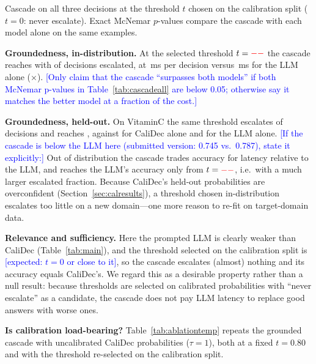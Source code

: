 \documentclass[twocolumn]{ICCKjournal}
\newcommand{\revnote}[1]{\textcolor{blue}{[#1]}}
\begin{document}
\begin{table}[t]
\caption{Cascade on all three decisions at the threshold $t$ chosen on the calibration split ($t=0$: never escalate). Exact McNemar $p$-values compare the cascade with each model alone on the same examples.}
\label{tab:cascadeall}
\centering
\begin{adjustbox}{max width=\linewidth}

\end{adjustbox}
\end{table}

\textbf{Groundedness, in-distribution.} At the selected threshold $t=\textcolor{red}{--}$ the cascade reaches \CascGrdTestAcc{} with \CascGrdTestEsc{} of decisions escalated, at \CascGrdMs{}\,ms per decision versus \CascGrdLLMMs{}\,ms for the LLM alone (\CascGrdSpeedup$\times$). \revnote{Only claim that the cascade ``surpasses both models'' if both McNemar p-values in Table~\ref{tab:cascadeall} are below 0.05; otherwise say it matches the better model at a fraction of the cost.}

\textbf{Groundedness, held-out.} On VitaminC the same threshold escalates \CascGrdHeldEsc{} of decisions and reaches \CascGrdHeldAcc{}, against \CascGrdNanoHeldAcc{} for CaliDec alone and \CascGrdLLMHeldAcc{} for the LLM alone. \revnote{If the cascade is below the LLM here (submitted version: 0.745 vs.\ 0.787), state it explicitly:} Out of distribution the cascade trades accuracy for latency relative to the LLM, and reaches the LLM's accuracy only from $t=\textcolor{red}{--}$, i.e.\ with a much larger escalated fraction. Because CaliDec's held-out probabilities are overconfident (Section~\ref{sec:calresults}), a threshold chosen in-distribution escalates too little on a new domain---one more reason to re-fit on target-domain data.

\textbf{Relevance and sufficiency.} Here the prompted LLM is clearly weaker than CaliDec (Table~\ref{tab:main}), and the threshold selected on the calibration split is \revnote{expected: $t=0$ or close to it}, so the cascade escalates (almost) nothing and its accuracy equals CaliDec's. We regard this as a desirable property rather than a null result: because thresholds are selected on calibrated probabilities with ``never escalate'' as a candidate, the cascade does not pay LLM latency to replace good answers with worse ones.

\textbf{Is calibration load-bearing?} Table~\ref{tab:ablationtemp} repeats the grounded cascade with uncalibrated CaliDec probabilities ($\tau=1$), both at a fixed $t=0.80$ and with the threshold re-selected on the calibration split.
\end{document}
